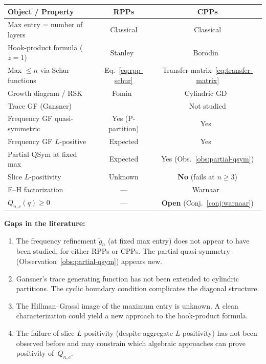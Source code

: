 \documentclass[11pt]{article}
\begin{document}
\begin{center}
\begin{tabular}{l|c|c}
  \textbf{Object / Property}
  & \textbf{RPPs}
  & \textbf{CPPs} \\
  \hline
  Max entry = number of layers
  & Classical & Classical \\
  Hook-product formula ($z = 1$)
  & Stanley~\cite{stanley-1972}
  & Borodin~\cite{borodin-2007} \\
  Max $\leq n$ via Schur functions
  & Eq.~\eqref{eq:rpp-schur}
  & Transfer matrix~\eqref{eq:transfer-matrix} \\
  Growth diagram / RSK
  & Fomin~\cite{fomin-1995}
  & Cylindric GD~\cite{langer-part-II} \\
  Trace GF (Gansner)
  & \cite{gansner-1981}
  & Not studied \\
  Frequency GF quasi-symmetric
  & Yes (P-partition)
  & Yes~\cite{langer-qsym} \\
  Frequency GF $L$-positive
  & Expected
  & Yes~\cite{langer-qsym} \\
  Partial QSym at fixed max
  & Expected
  & Yes (Obs.~\ref{obs:partial-qsym}) \\
  Slice $L$-positivity
  & Unknown
  & \textbf{No} (fails at $n \geq 3$) \\
  E--H factorization
  & ---
  & Warnaar~\cite{warnaar-2021} \\
  $Q_{n,c}(q) \geq 0$
  & ---
  & \textbf{Open} (Conj.~\ref{conj:warnaar})
\end{tabular}
\end{center}

\medskip

\noindent\textbf{Gaps in the literature:}
\begin{enumerate}
  \item The frequency refinement $\tilde{g}_n$ (at fixed
    max entry) does not appear to have been studied, for
    either RPPs or CPPs. The partial quasi-symmetry
    (Observation~\ref{obs:partial-qsym}) appears new.
  \item Gansner's trace generating function has not been
    extended to cylindric partitions. The cyclic boundary
    condition complicates the diagonal structure.
  \item The Hillman--Grassl image of the maximum entry is
    unknown. A clean characterization could yield a new
    approach to the hook-product formula.
  \item The failure of slice $L$-positivity (despite
    aggregate $L$-positivity) has not been observed before
    and may constrain which algebraic approaches can prove
    positivity of~$Q_{n,c}$.
\end{enumerate}
\end{document}
